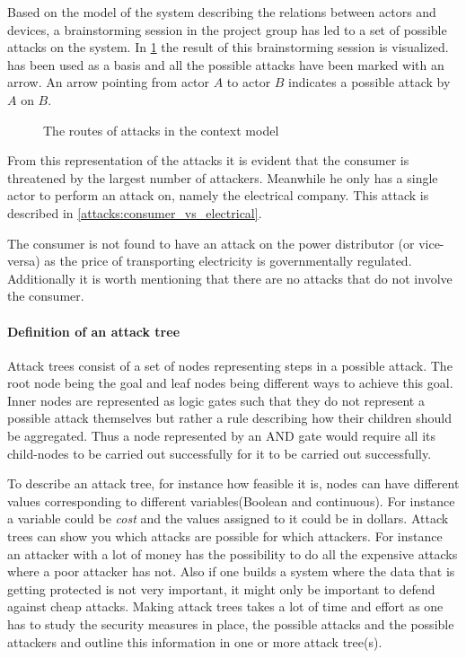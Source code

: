 
Based on the model of the system describing the relations between actors and devices, a brainstorming session in the project group has led to a set of possible attacks on the system.
In \cref{contextual:sm_model_attack} the result of this brainstorming session is visualized.
 has been used as a basis and all the possible attacks have been marked with an arrow.
An arrow pointing from actor $A$ to actor $B$ indicates a possible attack by $A$ on $B$.

\begin{figure}[h]
  \centering
  
  \caption{The routes of attacks in the context model}
  \label{contextual:sm_model_attack}
\end{figure}

From this representation of the attacks it is evident that the consumer is threatened by the largest number of attackers.
Meanwhile he only has a single actor to perform an attack on, namely the electrical company.
This attack is described in \cref{attacks:consumer_vs_electrical}.

The consumer is not found to have an attack on the power distributor (or vice-versa) as the price of transporting electricity is governmentally regulated.
Additionally it is worth mentioning that there are no attacks that do not involve the consumer.

\paragraph{Definition of an attack tree}
Attack trees consist of a set of nodes representing steps in a possible attack.
The root node being the goal and leaf nodes being different ways to achieve this goal.
Inner nodes are represented as logic gates such that they do not represent a possible attack themselves but rather a rule describing how their children should be aggregated.
Thus a node represented by an AND gate would require all its child-nodes to be carried out successfully for it to be carried out successfully.

To describe an attack tree, for instance how feasible it is, nodes can have different values corresponding to different variables(Boolean and continuous).
For instance a variable could be \textit{cost} and the values assigned to it could be in dollars.
Attack trees can show you which attacks are possible for which attackers.
For instance an attacker with a lot of money has the possibility to do all the expensive attacks where a poor attacker has not.
Also if one builds a system where the data that is getting protected is not very important, it might only be important to defend against cheap attacks.
Making attack trees takes a lot of time and effort as one has to study the security measures in place, the possible attacks and the possible attackers and outline this information in one or more attack tree(s).\cite{schneier_attack_trees}
